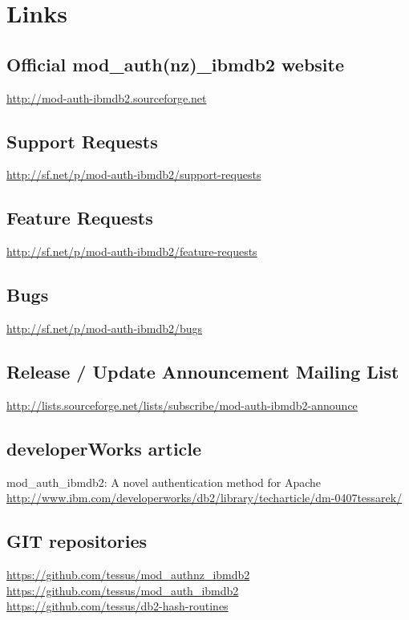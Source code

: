 \section{Links}
\subsection{Official mod\_auth(nz)\_ibmdb2 website}
\url{http://mod-auth-ibmdb2.sourceforge.net}
\subsection{Support Requests}
\url{http://sf.net/p/mod-auth-ibmdb2/support-requests}
\subsection{Feature Requests}
\url{http://sf.net/p/mod-auth-ibmdb2/feature-requests}
\subsection{Bugs}
\url{http://sf.net/p/mod-auth-ibmdb2/bugs}
\subsection{Release / Update Announcement Mailing List}
\url{http://lists.sourceforge.net/lists/subscribe/mod-auth-ibmdb2-announce}
\subsection{developerWorks article}
mod\_auth\_ibmdb2: A novel authentication method for Apache\\
\url{http://www.ibm.com/developerworks/db2/library/techarticle/dm-0407tessarek/}
\subsection{GIT repositories}
\url{https://github.com/tessus/mod_authnz_ibmdb2}\\
\url{https://github.com/tessus/mod_auth_ibmdb2}\\
\url{https://github.com/tessus/db2-hash-routines}\\
